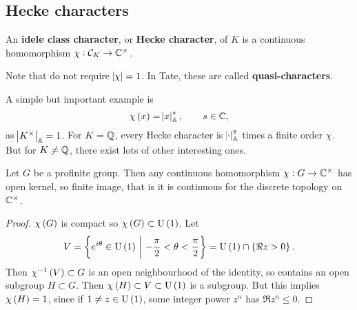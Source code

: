 \subsection{Hecke characters}

\begin{definition*}
An \textbf{idele class character}, or \textbf{Hecke character}, of $ K $ is a continuous homomorphism $ \chi : \mathcal{C}_K \to \mathbb{C}^\times $.
\end{definition*}

Note that do not require $ \abs{\chi} = 1 $. In Tate, these are called \textbf{quasi-characters}.

\begin{example*}
A simple but important example is
$$ \chi\br{x} = \abs{x}_\AA^s, \qquad s \in \CC, $$
as $ \abs{K^\times}_{\mathbb{A}} = 1 $. For $ K = \mathbb{Q} $, every Hecke character is $ \abs{\cdot}_{\mathbb{A}}^s $ times a finite order $ \chi $. But for $ K \ne \mathbb{Q} $, there exist lots of other interesting ones.
\end{example*}

\begin{proposition}
\label{prop:10.1}
Let $ G $ be a profinite group. Then any continuous homomorphism $ \chi : G \to \mathbb{C}^\times $ has open kernel, so finite image, that is it is continuous for the discrete topology on $ \mathbb{C}^\times $.
\end{proposition}

\begin{proof}
$ \chi\br{G} $ is compact so $ \chi\br{G} \subset \U\br{1} $. Let
$$ V = \cbr{e^{i\theta} \in \U\br{1} \st -\dfrac{\pi}{2} < \theta < \dfrac{\pi}{2}} = \U\br{1} \cap \cbr{\Re z > 0}. $$
Then $ \chi^{-1}\br{V} \subset G $ is an open neighbourhood of the identity, so contains an open subgroup $ H \subset G $. Then $ \chi\br{H} \subset V \subset \U\br{1} $ is a subgroup. But this implies $ \chi\br{H} = 1 $, since if $ 1 \ne z \in \U\br{1} $, some integer power $ z^n $ has $ \Re z^n \le 0 $.
\end{proof}


